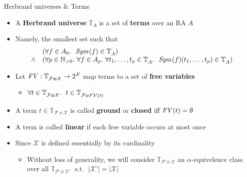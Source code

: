 \documentclass[pdf,fyma2]{prosper} %
\newcommand{\opr}[1]{\ensuremath{\operatorname{#1}}}
\newcommand{\var}[1]{\ensuremath{\text{\textrm{\textit{#1}}}}}
\newcommand{\WHOLE}{\ensuremath{\mathbb{N}_{{>}0}}}
\newcommand{\SYM}[1][]{\ensuremath{\var{Sym}_{#1}}}
\newcommand{\TERMS}[2][]{\ensuremath{\mathbb{T}_{#2}^{#1}}}
\newcommand{\FREEVARS}{\ensuremath{\var{FV}}}
\newcommand{\defn}[1]{\textbf{#1}}
\begin{document}
\begin{slide}{Herbrand universes \& Terms}
	\vspace{1em}
	\begin{itemize}
    \item A \defn{Herbrand universe} $\TERMS{A}$ is a set of \defn{terms} over an RA $A$
    \item Namely, the smallest set such that
\[
\begin{array}{rl}
 & (\forall f\in A_0.~
	~\SYM(f) \in \TERMS{A}) \\
\land & (\forall p \in \WHOLE.~
	\forall f\in A_p.~
		\forall t_1,\ldots,t_p \in \TERMS{A}.~
			~\SYM(f)(t_1,\ldots,t_p) \in \TERMS{A}) \\
\end{array}
\]
    \item Let $\FREEVARS : \TERMS{\mathcal{F}\uplus\mathcal{X}} \to 2^{\mathcal{X}}$ map terms to a set of \defn{free variables}
    	\begin{itemize}
    	\item $\forall t \in \TERMS{\mathcal{F}\uplus\mathcal{X}}.~~ t \in \TERMS{\mathcal{F}\uplus\FREEVARS(t)}$
    	\end{itemize}
    \item A term $t \in \TERMS{\mathcal{F}\uplus\mathcal{X}}$ is called \defn{ground} or \defn{closed} iff $\FREEVARS(t) = \emptyset$
    \item A term is called \defn{linear} if each free variable occurs at most once
	\vspace{1em}
    \item Since $\mathcal{X}$ is defined essentially by its cardinality
        \begin{itemize}
        \item Without loss of generality, we will consider $\TERMS{\mathcal{F}\uplus\mathcal{X}}$ an $\alpha$-equivelence class over all $\TERMS{\mathcal{F}\uplus\mathcal{X'}} \opr{~s.t.~} \lvert\mathcal{X'}\rvert = \lvert\mathcal{X}\rvert$
        \end{itemize}
	\end{itemize}
\end{slide}
\end{document}
